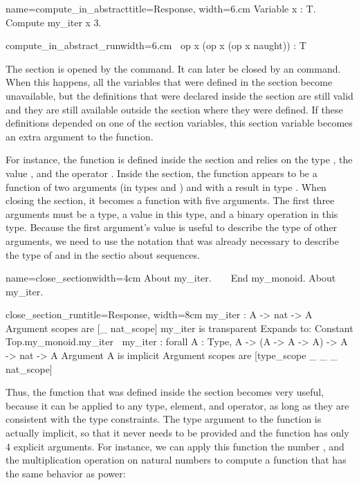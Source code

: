 \begin{coq}{name=compute_in_abstract}{title=Response, width=6.cm}
Variable x : T.
Compute my_iter x 3.
\end{coq}
\begin{coqout}{compute_in_abstract_run}{width=6.cm}
$~$
op x (op x (op x naught)) : T
\end{coqout}
The section is opened by the  command.  It can later be
closed by an  command.  When this happens, all the variables
that were defined in the section become unavailable, but the
definitions that were declared inside the section are still valid and
they are still available outside the section where they were defined.
If these definitions depended on one of the section variables, this
section variable becomes an extra argument to the function.

For instance, the function  is defined inside the section
and relies on the type , the value , and the operator
.  Inside the section, the function  appears to be a
function of two arguments (in types  and ) and with a
result in type .  When closing the section, it becomes a function
with five arguments.  The first three arguments must be a type, a
value in this type, and a binary operation in this type.  Because the
first argument's value is useful to describe the type of other
arguments, we need to use the notation  that was already
necessary to describe the type of  and  in the sectio
about sequences.

\begin{coq}{name=close_section}{width=4cm}
About my_iter.
$~$
$~$
$~$
End my_monoid.
About my_iter.
$~$
$~$
$~$
$~$
\end{coq}
\begin{coqout}{close_section_run}{title=Response, width=8cm}
my_iter : A -> nat -> A
Argument scopes are [_ nat_scope]
my_iter is transparent
Expands to: Constant Top.my_monoid.my_iter
$~$
my_iter : forall A : Type, A -> (A -> A -> A) -> A -> nat -> A
Argument A is implicit
Argument scopes are [type_scope _ _ _ nat_scope]
\end{coqout}
Thus, the function  that was defined inside the section
becomes very useful, because it can be applied to any type, element,
and operator, as long as they are consistent with the type
constraints.  The type argument to the function  is
actually implicit, so that it never needs to be provided and the
function has only 4 explicit arguments.
For instance, we can apply this function the
number , and the multiplication operation on natural numbers
to compute a function that has the same behavior as power:

